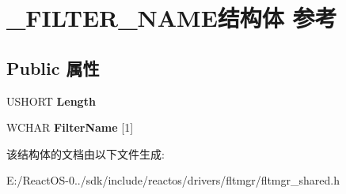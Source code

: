 \hypertarget{struct___f_i_l_t_e_r___n_a_m_e}{}\section{\+\_\+\+F\+I\+L\+T\+E\+R\+\_\+\+N\+A\+M\+E结构体 参考}
\label{struct___f_i_l_t_e_r___n_a_m_e}
\subsection*{Public 属性}
\begin{DoxyCompactItemize}
\item 
\mbox{\label{struct___f_i_l_t_e_r___n_a_m_e_ae188a5b9673856865ecac7c6ee49c0c6}} 
U\+S\+H\+O\+RT {\bfseries Length}
\item 
\mbox{\label{struct___f_i_l_t_e_r___n_a_m_e_a9f27abb52a5c22d0e263813c35d49391}} 
W\+C\+H\+AR {\bfseries Filter\+Name} \mbox{[}1\mbox{]}
\end{DoxyCompactItemize}


该结构体的文档由以下文件生成\+:\begin{DoxyCompactItemize}
\item 
E\+:/\+React\+O\+S-\/0../sdk/include/reactos/drivers/fltmgr/fltmgr\+\_\+shared.\+h\end{DoxyCompactItemize}
